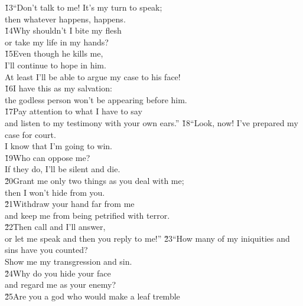 \begin{poetry}
\poeml \v{13}``Don't talk to me! It's my turn to speak; \\
\poemll    then whatever happens, happens. \\
\poeml \v{14}Why shouldn't I bite my flesh \\
\poemll    or take my life in my hands? \\
\poeml \v{15}Even though he kills me, \\
\poemll    I'll continue to hope in him. \\
\poemlll       At least I'll be able to argue my case to his face! \\
\poeml \v{16}I have this as my salvation: \\
\poemll    the godless person won't be appearing before him. \\
\poeml \v{17}Pay attention to what I have to say \\
\poemll    and listen to my testimony with your own ears.''
\poeml \v{18}``Look, now! I've prepared my case for court. \\
\poemll    I know that I'm going to win. \\
\poeml \v{19}Who can oppose me? \\
\poemll    If they do, I'll be silent and die. \\
\poeml \v{20}Grant me only two things as you deal with me; \\
\poemll    then I won't hide from you. \\
\poeml \v{21}Withdraw your hand far from me \\
\poemll    and keep me from being petrified with terror. \\
\poeml \v{22}Then call and I'll answer, \\
\poemll    or let me speak and then you reply to me!''
\poeml \v{23}``How many of my iniquities and sins have you counted? \\
\poemll    Show me my transgression and sin. \\
\poeml \v{24}Why do you hide your face \\
\poemll    and regard me as your enemy? \\
\poeml \v{25}Are you a god who would make a leaf tremble \\

\end{poetry}
